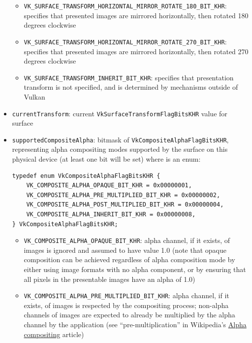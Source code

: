 \documentclass[12pt,letterpaper]{article}
\newcommand{\inquotes}[1]{``#1''}	%
\newcommand{\cil}[1]{\texttt{#1}}
\begin{document}
\begin{itemize}
\begin{itemize}
                \item \cil{VK_SURFACE_TRANSFORM_HORIZONTAL_MIRROR_ROTATE_180_BIT_KHR}: specifies that presented images are mirrored horizontally, then rotated 180 degrees clockwise
                
                \item \cil{VK_SURFACE_TRANSFORM_HORIZONTAL_MIRROR_ROTATE_270_BIT_KHR}: specifies that presented images are mirrored horizontally, then rotated 270 degrees clockwise
                
                \item \cil{VK_SURFACE_TRANSFORM_INHERIT_BIT_KHR}: specifies that presentation transform is not specified, and is determined by mechanisms outside of Vulkan
            \end{itemize}
        
        \item \cil{currentTransform}: current \cil{VkSurfaceTransformFlagBitsKHR} value for surface
        
        \item \cil{supportedCompositeAlpha}: bitmask of \cil{VkCompositeAlphaFlagBitsKHR}, representing alpha compositing modes supported by the surface on this physical device (at least one bit will be set) where \cil{} is an enum: 
\begin{verbatim}
typedef enum VkCompositeAlphaFlagBitsKHR {
    VK_COMPOSITE_ALPHA_OPAQUE_BIT_KHR = 0x00000001,
    VK_COMPOSITE_ALPHA_PRE_MULTIPLIED_BIT_KHR = 0x00000002,
    VK_COMPOSITE_ALPHA_POST_MULTIPLIED_BIT_KHR = 0x00000004,
    VK_COMPOSITE_ALPHA_INHERIT_BIT_KHR = 0x00000008,
} VkCompositeAlphaFlagBitsKHR;
\end{verbatim}
    \begin{itemize}
        \item \cil{VK_COMPOSITE_ALPHA_OPAQUE_BIT_KHR}: alpha channel, if it exists, of images is ignored and assumed to have value 1.0 (note that opaque composition can be achieved regardless of alpha composition mode by either using image formats with no alpha component, or by ensuring that all pixels in the presentable images have an alpha of 1.0)
        
        \item \cil{VK_COMPOSITE_ALPHA_PRE_MULTIPLIED_BIT_KHR}: alpha channel, if it exists, of images is respected by the compositing process; non-alpha channels of images are expected to already be multiplied by the alpha channel by the application (see \inquotes{pre-multiplication} in Wikipedia's \href{https://en.wikipedia.org/wiki/Alpha_compositing}{Alpha compositing} article)
        

\end{itemize}
\end{itemize}
\end{document}
